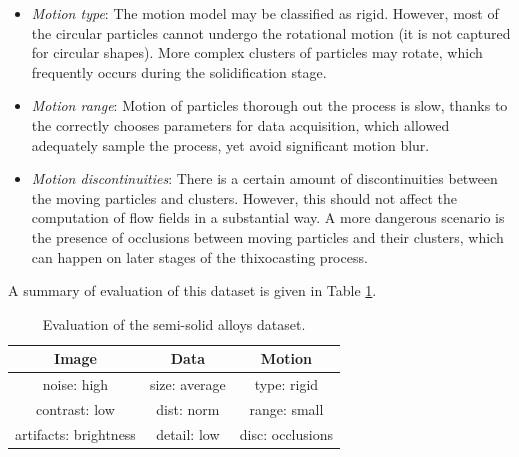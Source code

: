 \begin{itemize}
	\item \textit{Motion type}: The motion model may be classified as rigid. However, most of the circular particles cannot undergo the rotational motion (it is not captured for circular shapes). More complex clusters of particles may rotate, which frequently occurs during the solidification stage.
	
	\item \textit{Motion range}: Motion of particles thorough out the process is slow, thanks to the correctly chooses parameters for data acquisition, which allowed adequately sample the process, yet avoid significant motion blur.
	
	\item \textit{Motion discontinuities}: There is a certain amount of discontinuities between the moving particles and clusters. However, this should not affect the computation of flow fields in a substantial way.  A more dangerous scenario is the presence of occlusions between moving particles and their clusters, which can happen on later stages of the thixocasting process.
\end{itemize}




A summary of evaluation of this dataset is given in Table \ref{tab:eval_thixo}.
\begin{table}[ht] \footnotesize
	\centering
	\caption{Evaluation of the semi-solid alloys dataset.}
	\begin{tabular}{ccc}
		\toprule
		\textbf{Image} & \textbf{Data}   & \textbf{Motion}   \\ 
		\midrule
		\cellcolor{bad} noise: high       & \cellcolor{good} size:  average  & \cellcolor{good}type: rigid    \\ 
		\cellcolor{bad} contrast: low      & \cellcolor{good} dist: norm            & \cellcolor{good} range: small  \\ 
		\cellcolor{bad} artifacts: brightness   & \cellcolor{bad}detail: low  &  \cellcolor{norm} disc: occlusions   \\ 
		\bottomrule
	\end{tabular}
	\label{tab:eval_thixo}%
\end{table}


